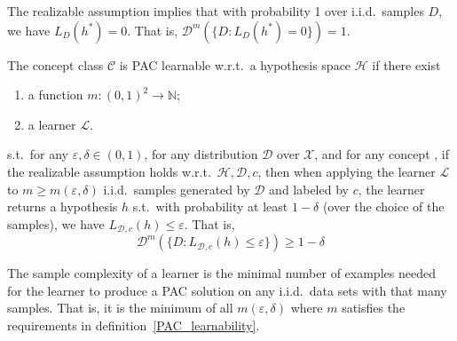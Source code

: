 \begin{re}
    The realizable assumption implies that with probability 1 over i.i.d.\ samples $D$, we have $L_D(h^*) = 0$.
    That is, $\mathcal{D}^m(\{D: L_D(h^*) = 0\}) = 1$.
\end{re}

\begin{df}\label{PAC_learnability}
    The concept class $\mathcal{C}$ is PAC learnable w.r.t.\ a hypothesis space $\mathcal{H}$ if there exist
    \begin{enumerate}
        \item a function $m: {(0, 1)}^2 \longrightarrow \mathbb{N}$;
        \item a learner $\mathcal{L}$.
    \end{enumerate}
    s.t.\ for any $\varepsilon, \delta \in (0, 1)$, for any distribution $\mathcal{D}$ over $\mathcal{X}$, and
    for any concept , if the realizable assumption holds w.r.t.\ $\mathcal{H}, \mathcal{D}, c$, then
    when applying the learner $\mathcal{L}$ to $m \geq m(\varepsilon, \delta)$ i.i.d.\ samples generated by
    $\mathcal{D}$ and labeled by $c$, the learner returns a hypothesis $h$ s.t.\ with probability at least 
    $1 - \delta$ (over the choice of the samples), we have $L_{\mathcal{D},c}(h) \leq \varepsilon$. That is,
    $$\mathcal{D}^m(\{D: L_{\mathcal{D},c}(h) \leq \varepsilon\}) \geq 1 - \delta$$
\end{df}

\begin{df}
    The sample complexity of a learner is the minimal number of examples needed for the learner to produce a 
    PAC solution on any i.i.d.\ data sets with that many samples. That is, it is the minimum of all 
    $m(\varepsilon, \delta)$ where $m$ satisfies the requirements in definition~\ref{PAC_learnability}.
\end{df}


